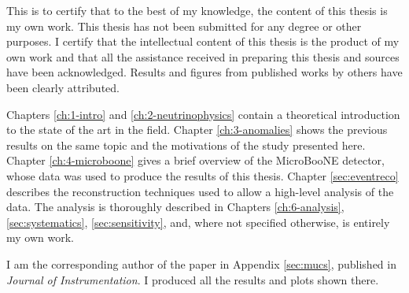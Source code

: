 This is to certify that to the best of my knowledge, the content of this thesis is my own work. This thesis has not been submitted for any degree or other purposes.
I certify that the intellectual content of this thesis is the product of my own work and that all the assistance received in preparing this thesis and sources have been acknowledged. Results and figures from published works by others have been clearly attributed.

Chapters \ref{ch:1-intro} and \ref{ch:2-neutrinophysics} contain a theoretical introduction to the state of the art in the field. Chapter \ref{ch:3-anomalies} shows the previous results on the same topic and the motivations of the study presented here. Chapter \ref{ch:4-microboone} gives a brief overview of the MicroBooNE detector, whose data was used to produce the results of this thesis. 
Chapter \ref{sec:eventreco} describes the reconstruction techniques used to allow a high-level analysis of the data. The analysis is thoroughly described in Chapters \ref{ch:6-analysis}, \ref{sec:systematics}, \ref{sec:sensitivity}, and, where not specified otherwise, is entirely my own work.

I am the corresponding author of the paper in Appendix \ref{sec:mucs}, published in \emph{Journal of Instrumentation}. I produced all the results and plots shown there.